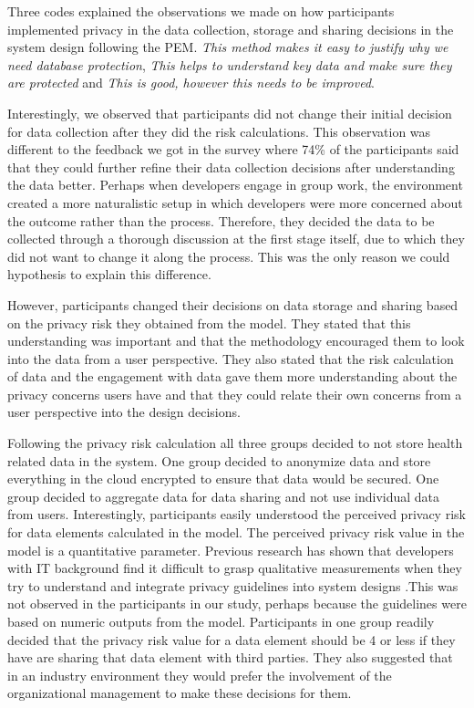 \documentclass{sigchi}
\begin{document}
Three codes explained the observations we made on how participants implemented privacy in the data collection, storage and sharing decisions in the system design following the PEM. \textit{This method makes it easy to justify why we need database protection}, \textit{This helps to understand key data and make sure they are protected} and \textit{This is good, however this needs to be improved}.

Interestingly, we observed that participants did not change their initial decision for data collection after they did the risk calculations. This observation was different to the feedback we got in the survey where 74\% of the participants said that they could further refine their data collection decisions after understanding the data better. Perhaps when developers engage in group work, the environment created a more naturalistic setup in which developers were more concerned about the outcome rather than the process. Therefore, they decided the data to be collected through a thorough discussion at the first stage itself, due to which they did not want to change it along the process. This was the only reason we could hypothesis to explain this difference.

However, participants changed their decisions on data storage and sharing based on the privacy risk they obtained from the model. They stated that this understanding was important and that the methodology encouraged them to look into the data from a user perspective. They also stated that the risk calculation of data and the engagement with data gave them more understanding about the privacy concerns users have and that they could relate their own concerns from a user perspective into the design decisions. 

Following the privacy risk calculation all three groups decided to not store health related data in the system. One group decided to anonymize data and store everything in the cloud encrypted to ensure that data would be secured. One group decided to aggregate data for data sharing and not use individual data from users. Interestingly, participants easily understood the perceived privacy risk for data elements calculated in the model. The perceived privacy risk value in the model is a quantitative parameter. Previous research has shown that developers with IT background find it difficult to grasp qualitative measurements when they try to understand and integrate privacy guidelines into system designs \cite {senarath2018why, oetzel2014systematic}.This was not observed in the participants in our study, perhaps because the guidelines were based on numeric outputs from the model. Participants in one group readily decided that the privacy risk value for a data element should be 4 or less if they have are sharing that data element with third parties. They also suggested that in an industry environment they would prefer the involvement of the organizational management to make these decisions for them.
\end{document}

